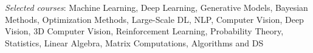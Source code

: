 \textit{Selected courses}: Machine Learning, Deep Learning, Generative Models, Bayesian Methods, Optimization Methods, Large-Scale DL, NLP, Computer Vision, Deep Vision, 3D Computer Vision, Reinforcement Learning, Probability Theory, Statistics, Linear Algebra, Matrix Computations, Algorithms and DS
